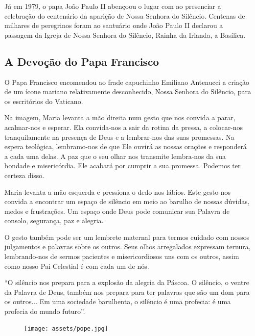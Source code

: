 \documentclass[a4paper,14pt]{extarticle} \usepackage[utf8]{inputenc}
\begin{document}
Já em 1979, o papa João Paulo II abençoou o lugar com ao presenciar a celebração do centenário da aparição de Nossa Senhora do Silêncio. Centenas de milhares de peregrinos foram ao santuário onde João Paulo II declarou a passagem da Igreja de Nossa Senhora do Silêncio, Rainha da Irlanda, a Basílica.

\subsection{A Devoção do Papa Francisco}

O Papa Francisco encomendou ao frade capuchinho Emiliano Antenucci a criação de um ícone mariano relativamente desconhecido, Nossa Senhora do Silêncio, para os escritórios do Vaticano.

Na imagem, Maria levanta a mão direita num gesto que nos convida a parar, acalmar-nos e esperar. Ela convida-nos a sair da rotina da pressa, a colocar-nos tranquilamente na presença de Deus e a lembrar-nos das suas promessas. Na espera teológica, lembramo-nos de que Ele ouvirá as nossas orações e responderá a cada uma delas. A paz que o seu olhar nos transmite lembra-nos da sua bondade e misericórdia. Ele acabará por cumprir a sua promessa. Podemos ter certeza disso.

Maria levanta a mão esquerda e pressiona o dedo nos lábios. Este gesto nos convida a encontrar um espaço de silêncio em meio ao barulho de nossas dúvidas, medos e frustrações. Um espaço onde Deus pode comunicar sua Palavra de consolo, segurança, paz e alegria.

O gesto também pode ser um lembrete maternal para termos cuidado com nossos julgamentos e palavras sobre os outros. Seus olhos arregalados expressam ternura, lembrando-nos de sermos pacientes e misericordiosos uns com os outros, assim como nosso Pai Celestial é com cada um de nós.

“O silêncio nos prepara para a explosão da alegria da Páscoa. O silêncio, o ventre da Palavra de Deus, também nos prepara para ter palavras que são um dom para os outros... Em uma sociedade barulhenta, o silêncio é uma profecia: é uma profecia do mundo futuro”.


\begin{figure}
  \begin{center}
    \texttt{[image: assets/pope.jpg]}
  \end{center}
\end{figure}



\newpage
\end{document}
